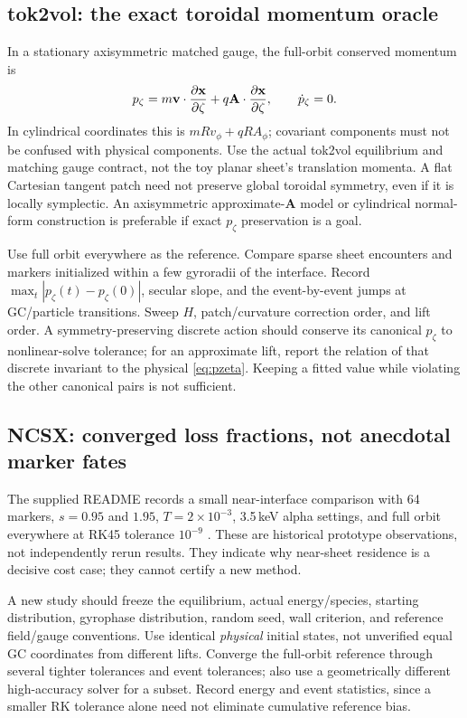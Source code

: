 \documentclass[10pt,a4paper]{article}
\newcommand{\A}{\mathbf A}\newcommand{\dd}{\mathrm d}
\begin{document}
\subsection{tok2vol: the exact toroidal momentum oracle}
In a stationary axisymmetric matched gauge, the full-orbit conserved momentum is
\begin{equation}\label{eq:pzeta}
 p_\zeta=m\v\cdot\frac{\partial\x}{\partial\zeta}
              +q\A\cdot\frac{\partial\x}{\partial\zeta},\qquad\dot p_\zeta=0.
\end{equation}
In cylindrical coordinates this is $mR v_\phi+qR A_\phi$; covariant components must not be confused with physical components. Use the actual tok2vol equilibrium and matching gauge contract, not the toy planar sheet's translation momenta. A flat Cartesian tangent patch need not preserve global toroidal symmetry, even if it is locally symplectic. An axisymmetric approximate-$\A$ model or cylindrical normal-form construction is preferable if exact $p_\zeta$ preservation is a goal.

Use full orbit everywhere as the reference. Compare sparse sheet encounters and markers initialized within a few gyroradii of the interface. Record $\max_t|p_\zeta(t)-p_\zeta(0)|$, secular slope, and the event-by-event jumps at GC/particle transitions. Sweep $H$, patch/curvature correction order, and lift order. A symmetry-preserving discrete action should conserve its canonical $p_\zeta$ to nonlinear-solve tolerance; for an approximate lift, report the relation of that discrete invariant to the physical \eqref{eq:pzeta}. Keeping a fitted value while violating the other canonical pairs is not sufficient.

\subsection{NCSX: converged loss fractions, not anecdotal marker fates}
The supplied README records a small near-interface comparison with 64 markers, $s=0.95$ and $1.95$, $T=2\times10^{-3}$, 3.5\,keV alpha settings, and full orbit everywhere at RK45 tolerance $10^{-9}$ \cite{sheetreadme}. These are historical prototype observations, not independently rerun results. They indicate why near-sheet residence is a decisive cost case; they cannot certify a new method.

A new study should freeze the equilibrium, actual energy/species, starting distribution, gyrophase distribution, random seed, wall criterion, and reference field/gauge conventions. Use identical \emph{physical} initial states, not unverified equal GC coordinates from different lifts. Converge the full-orbit reference through several tighter tolerances and event tolerances; also use a geometrically different high-accuracy solver for a subset. Record energy and event statistics, since a smaller RK tolerance alone need not eliminate cumulative reference bias.
\end{document}
